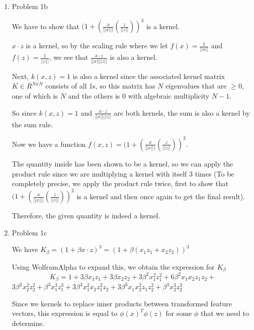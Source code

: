 \documentclass[11pt]{article}
\newcommand{\solution}[1]{{{\color{blue}{\bf Solution:} {#1}}}}
\begin{document}
\begin{enumerate}
\vspace{1cm}
\item Problem 1b

\solution{
We have to show that $(1 + (\frac{x}{||x||)} (\frac{z}{||z||}))^3$ is a kernel. \newline{}

$x \cdot z$ is a kernel, so by the scaling rule where we let $f(x) = \frac{1}{||x||}$ and $f(z) = \frac{1}{||z||}$, we see that $\frac{x \cdot z}{||x||||z||}$ is also a kernel. \newline{}

Next, $k(x,z) = 1$ is also a kernel since the associated kernel matrix $K \in R^{N xN}$ consists of all 1s, so this matrix has $N$ eigenvalues that are $\geq 0$, one of which is $N$ and the others is $0$ with algebraic multiplicity $N-1$. \newline{}

So since $k(x,z) = 1$ and $\frac{x \cdot z}{||x||||z||}$ are both kernels, the sum is also a kernel by the sum rule. \newline{}

Now we have a function $ f(x,z) = (1 + (\frac{x}{||x||)} (\frac{z}{||z||}))^3$. \newline{}

The quantity inside has been shown to be a kernel, so we can apply the product rule since we are multiplying a kernel with itself 3 times (To be completely precise, we apply the product rule twice, first to show that $(1 + (\frac{x}{||x||)} (\frac{z}{||z||}))^2$ is a kernel and then once again to get the final result). \newline{}

Therefore, the given quantity is indeed a kernel.
}
\vspace{1cm}
\item Problem 1c

\solution{
We have $K_{\beta} = (1 + \beta x \cdot z)^3 = (1 + \beta(x_1z_1 + x_2z_2))^3$ \newline{}

Using WolframAlpha to expand this, we obtain the expression for $K_\beta$ 
\[ K_\beta = 1 + 3 \beta x_1z_1 + 3\beta x_2z_2 + 3 \beta^2 x_1^2z_1^2 + 6\beta^2 x_1 x_2 z_1 z_2 + \] $3\beta^2 x_2^2 z_2^2 + \beta^3 x_1^3 z_1^3 + 3\beta^3 x_1^2 x_2 z_1^2 z_2 + 3\beta^3 x_1 x_2^2 z_1 z_2^2 + \beta^3 x_2^3 z_2^3 $ \newline{}

Since we kernels to replace inner products between transformed feature vectors, this expression is equal to $\phi(x)^T \phi(z)$ for some $\phi$ that we need to determine. \newline{}

}
\end{enumerate}
\end{document}
